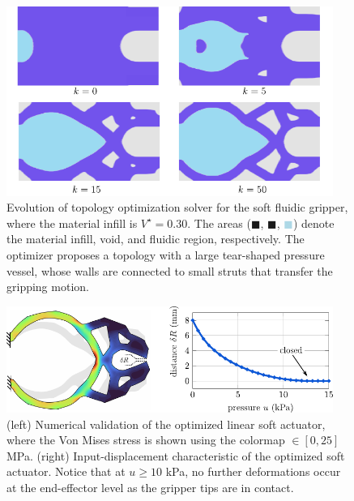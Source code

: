 \begin{figure}[!t]
  \centering
  \vspace{-3mm}
  \includegraphics*[width=0.95\textwidth]{./pdf/thesis-figure-3-7.pdf}
  \caption{\small Evolution of topology optimization solver for the soft fluidic gripper, where the material infill is $V^\star = 0.30$. The areas (\textcolor{matinfil}{$\blacksquare$}, \textcolor{lightvoid}{$\blacksquare$}, \textcolor{lightblue}{$\blacksquare$}) denote the material infill, void, and fluidic region, respectively. The optimizer proposes a topology with a large tear-shaped pressure vessel, whose walls are connected to small struts that transfer the gripping motion.}
  \label{fig:C3:topo_result_gripper}
  \vspace{-3mm}
\end{figure}

\begin{figure}[!t]
  \centering
  \vspace{-3mm}
  \includegraphics*[width=0.95\textwidth]{./pdf/thesis-figure-3-6.pdf}
  \caption{\small (left) Numerical validation of the optimized linear soft actuator, where the Von Mises stress is shown using the colormap \protect{}$\!\!\in [0,25]$ \si{\mega\pascal}. (right) Input-displacement characteristic of the optimized soft actuator. Notice that at $u \ge 10$ \si{\kilo\pascal}, no further deformations occur at the end-effector level as the gripper tips are in contact.}
  \label{fig:C3:topo_result_gripper_fem}
\end{figure}

